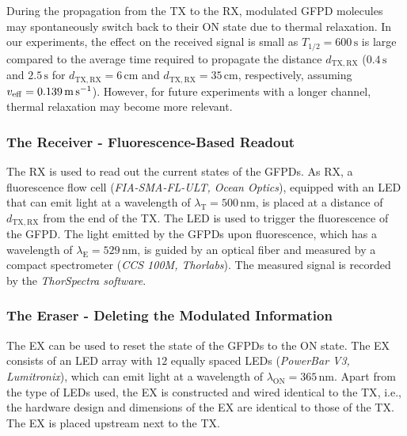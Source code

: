 During the propagation from the \ac{TX} to the \ac{RX}, modulated \ac{GFPD} molecules may spontaneously switch back to their ON state due to thermal relaxation.
In our experiments, the effect on the received signal is small as $T_{1/2} = 600 \,\si{\second}$ is large compared to the average time required to propagate the distance $d_{\mathrm{TX},\mathrm{RX}}$ ($0.4 \, \si{\second}$ and $2.5 \,\si{\second}$ for $d_{\mathrm{TX}, \mathrm{RX}} = 6 \, \si{\centi\meter}$ and $d_{\mathrm{TX},\mathrm{RX}} = 35 \, \si{\centi\meter}$, respectively, assuming $v_{\mathrm{eff}} = 0.139 \,\si{\meter \per\second}$). However, for future experiments with a longer channel, thermal relaxation may become more relevant.
%
\scaleSubsubsection
\subsubsection{The Receiver - Fluorescence-Based Readout}\label{subsubsec:rx}
\scaleSubsubsectionBelow
The \ac{RX} is used to read out the current states of the \acp{GFPD}. 
As \ac{RX}, a fluorescence flow cell (\textit{FIA-SMA-FL-ULT, Ocean Optics}), equipped with an \ac{LED} that can emit light at a wavelength of $\lambda_\mathrm{T} = 500 \, \si{\nm}$, is placed at a distance of $d_{\mathrm{TX},\mathrm{RX}}$ from the end of the \ac{TX}. The \ac{LED} is used to trigger the fluorescence of the \ac{GFPD}. The light emitted by the \acp{GFPD} upon fluorescence, which has a wavelength of $\lambda_\mathrm{E} = 529 \, \si{\nm}$, is guided by an optical fiber and measured by a compact spectrometer (\textit{CCS 100M, Thorlabs}). The measured signal is recorded by the \textit{ThorSpectra software}. 
%
\scaleSubsubsection
\subsubsection{The Eraser - Deleting the Modulated Information}\label{subsubsec:ex}
\scaleSubsubsectionBelow
The \ac{EX} can be used to reset the state of the \acp{GFPD} to the ON state. 
The \ac{EX} consists of an \ac{LED} array with $12$ equally spaced \acp{LED} (\textit{PowerBar V3, Lumitronix}), which can emit light at a wavelength of $\lambda_\mathrm{ON} = 365 \, \si{\nano\meter}$. Apart from the type of \acp{LED} used, the \ac{EX} is constructed and wired identical to the \ac{TX}, i.e., the hardware design and dimensions of the \ac{EX} are identical to those of the \ac{TX}. The \ac{EX} is placed upstream next to the \ac{TX}.


